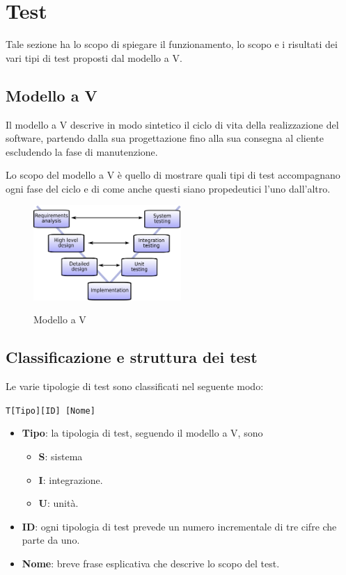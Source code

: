 \section{Test}

Tale sezione ha lo scopo di spiegare il funzionamento, lo scopo e i risultati dei vari tipi di test proposti dal modello a V.

\subsection{Modello a V}
Il modello a V descrive in modo sintetico il ciclo di vita della realizzazione del software, partendo dalla sua progettazione fino alla sua consegna al cliente escludendo la fase di manutenzione.

Lo scopo del modello a V è quello di mostrare quali tipi di test accompagnano ogni fase del ciclo e di come anche questi siano propedeutici l'uno dall'altro.

\begin{figure}[H]
	\centering
	\includegraphics[width=0.5\textwidth]{img/V-model.png}
	\label{img:vmodel}
	\caption{Modello a V\protect\footnotemark}
\end{figure}


\subsection{Classificazione e struttura dei test}
Le varie tipologie di test sono classificati nel seguente modo:

\begin{center}
	\texttt{T[Tipo][ID] [Nome]}
\end{center}

\begin{itemize}
	\item \textbf{Tipo}: la tipologia di test, seguendo il modello a V, sono
	\begin{itemize}
		\item \textbf{S}: sistema
		\item \textbf{I}: integrazione.
		\item \textbf{U}: unità.
	\end{itemize}
	\item \textbf{ID}: ogni tipologia di test prevede un numero incrementale di tre cifre che parte da uno.
	\item \textbf{Nome}: breve frase esplicativa che descrive lo scopo del test.
\end{itemize}

